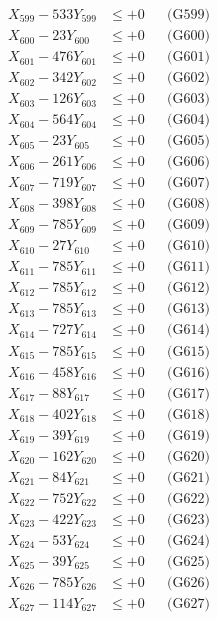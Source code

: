 \documentclass[a4paper,10pt]{article}
\begin{document}
{\begin{align}
X_{599} - 533Y_{599} &\leq +0 && \text{(G599)} \\
X_{600} - 23Y_{600} &\leq +0 && \text{(G600)} \\
\allowbreak
X_{601} - 476Y_{601} &\leq +0 && \text{(G601)} \\
X_{602} - 342Y_{602} &\leq +0 && \text{(G602)} \\
X_{603} - 126Y_{603} &\leq +0 && \text{(G603)} \\
X_{604} - 564Y_{604} &\leq +0 && \text{(G604)} \\
X_{605} - 23Y_{605} &\leq +0 && \text{(G605)} \\
X_{606} - 261Y_{606} &\leq +0 && \text{(G606)} \\
X_{607} - 719Y_{607} &\leq +0 && \text{(G607)} \\
X_{608} - 398Y_{608} &\leq +0 && \text{(G608)} \\
X_{609} - 785Y_{609} &\leq +0 && \text{(G609)} \\
X_{610} - 27Y_{610} &\leq +0 && \text{(G610)} \\
\allowbreak
X_{611} - 785Y_{611} &\leq +0 && \text{(G611)} \\
X_{612} - 785Y_{612} &\leq +0 && \text{(G612)} \\
X_{613} - 785Y_{613} &\leq +0 && \text{(G613)} \\
X_{614} - 727Y_{614} &\leq +0 && \text{(G614)} \\
X_{615} - 785Y_{615} &\leq +0 && \text{(G615)} \\
X_{616} - 458Y_{616} &\leq +0 && \text{(G616)} \\
X_{617} - 88Y_{617} &\leq +0 && \text{(G617)} \\
X_{618} - 402Y_{618} &\leq +0 && \text{(G618)} \\
X_{619} - 39Y_{619} &\leq +0 && \text{(G619)} \\
X_{620} - 162Y_{620} &\leq +0 && \text{(G620)} \\
\allowbreak
X_{621} - 84Y_{621} &\leq +0 && \text{(G621)} \\
X_{622} - 752Y_{622} &\leq +0 && \text{(G622)} \\
X_{623} - 422Y_{623} &\leq +0 && \text{(G623)} \\
X_{624} - 53Y_{624} &\leq +0 && \text{(G624)} \\
X_{625} - 39Y_{625} &\leq +0 && \text{(G625)} \\
X_{626} - 785Y_{626} &\leq +0 && \text{(G626)} \\
X_{627} - 114Y_{627} &\leq +0 && \text{(G627)} \\

\end{align}}
\end{document}
